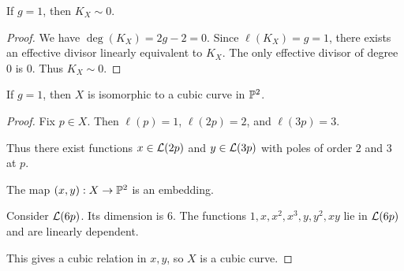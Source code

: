 \begin{theorem*}{
    If $g = 1$, then $K_X \sim 0$.
}
\end{theorem*}

\begin{proof}
    We have $\deg(K_X) = 2g - 2 = 0$.
    Since $\ell(K_X) = g = 1$, there exists an effective divisor linearly equivalent to $K_X$.
    The only effective divisor of degree $0$ is $0$.
    Thus $K_X \sim 0$.
\end{proof}

\begin{theorem*}{
    If $g = 1$, then $X$ is isomorphic to a cubic curve in $\mathbb{P}^2$.
}
\end{theorem*}

\begin{proof}
    Fix $p \in X$.
    Then $\ell(p) = 1$, $\ell(2p) = 2$, and $\ell(3p) = 3$.

    Thus there exist functions $x \in \mathcal{L}(2p)$ and $y \in \mathcal{L}(3p)$ with poles of order $2$ and $3$ at $p$.

    The map $(x,y) : X \to \mathbb{P}^2$ is an embedding.

    Consider $\mathcal{L}(6p)$.
    Its dimension is $6$.
    The functions $1, x, x^2, x^3, y, y^2, xy$ lie in $\mathcal{L}(6p)$ and are linearly dependent.

    This gives a cubic relation in $x,y$, so $X$ is a cubic curve.
\end{proof}